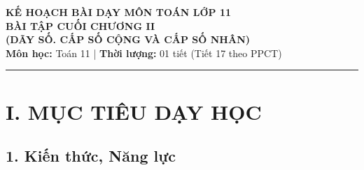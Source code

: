 \documentclass[12pt, a4paper]{article}
\begin{document}
\begin{center}
    {\Large \textbf{KẾ HOẠCH BÀI DẠY MÔN TOÁN LỚP 11}}\\[0.4em]
    {\LARGE \textbf{BÀI TẬP CUỐI CHƯƠNG II}}\\[0.3em]
    {\large \textbf{(DÃY SỐ. CẤP SỐ CỘNG VÀ CẤP SỐ NHÂN)}}\\[0.5em]
    \textbf{Môn học:} Toán 11 | \textbf{Thời lượng:} 01 tiết (Tiết 17 theo PPCT)
\end{center}

\vspace{0.5em}
\hrule
\vspace{1em}

\section*{I. MỤC TIÊU DẠY HỌC}

\subsection*{1. Kiến thức, Năng lực}
\end{document}
